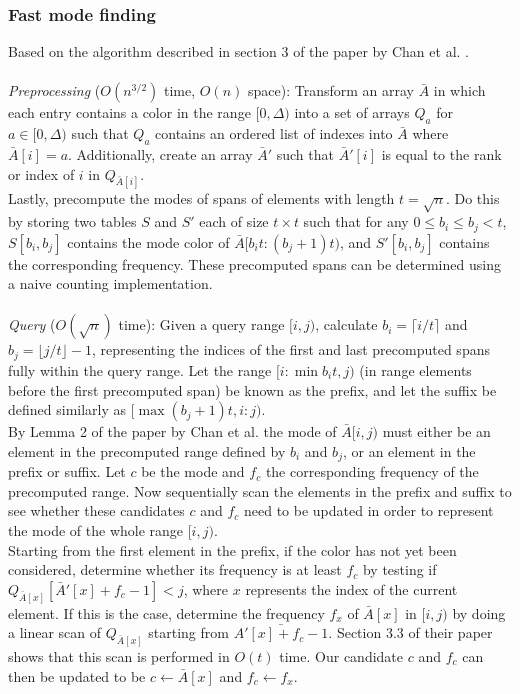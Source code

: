\documentclass{article}
\newcommand{\fb}[1]{{#1}}
\begin{document}
\subsubsection{Fast mode finding}
Based on the algorithm described in section 3 of the paper by Chan et al.
\cite{Chan2014}. \\\\ 
\textit{Preprocessing} ($O(n^{3/2})$ time, $O(n)$ space): Transform an array $\bar{A}$ in
which each entry contains a color in the range $[0, \Delta)$ into a set of
arrays $Q_a$ for $a \in [0, \Delta)$ such that $Q_a$ contains an ordered list
of indexes into $\bar{A}$ where $\bar{A}[i] = a$. Additionally, create an array
$\bar{A}'$ such that $\bar{A}'[i]$ is equal to the rank or index of $i$ in
$Q_{\bar{A}[i]}$. \\ Lastly, precompute the modes of spans of elements with
length $t = \sqrt{n}$. Do this by storing two tables $S$ and $S'$ each of size
$t \times t$ such that for any $0\leq b_i \leq b_j < t$, $S[b_i, b_j]$ contains
the mode color of $\bar{A}[b_it : (b_j + 1)t)$, and $S'[b_i, b_j]$ contains the
corresponding frequency. These precomputed spans can be determined using a
naive counting implementation. \\\\ 
\textit{Query} ($O(\sqrt{n})$ time): Given a query range $[i, j)$, calculate $b_i=\lceil i/t \rceil$ and $b_j=\lfloor j/t \rfloor - 1$,
representing the indices of the first and last precomputed spans fully within
the query range. Let the range $[i : \min{b_it, j})$ (in range elements before
the first precomputed span) be known as the prefix, and let the suffix be
defined similarly as $[\max{(b_j + 1)t, i} : j)$. \\ \fb{By Lemma 2 of the paper by Chan et al.} the mode of $\bar{A}[i,
    j)$ must either be an element in the precomputed range defined by $b_i$ and
$b_j$, or an element in the prefix or suffix. Let $c$ be the mode and $f_c$ the
corresponding frequency of the precomputed range. Now sequentially scan the
elements \fb{in} the prefix and suffix to see whether these candidates $c$ and $f_c$
need to be updated in order to represent the mode of the whole range $[i, j)$.
\\ Starting from the first element in the prefix, if the color has not yet been
considered, determine whether its frequency is at least $f_c$ by testing if
$Q_{\bar{A}[x]}[\bar{A}'[x] + f_c - 1] < j$, where $x$ represents the index of
the current element. If this is the case, determine the frequency $f_x$ of
$\bar{A}[x]$ in $[i, j)$ by doing a linear scan of $Q_{\bar{A}[x]}$ \fb{starting from $\bar{A'[x] + f_c - 1}$. Section 3.3 of their paper shows that this scan is performed in $O(t)$ time}. Our
candidate $c$ and $f_c$ can then be updated to be $c \leftarrow \bar{A}[x]$ and
$f_c \leftarrow f_x$.
\end{document}
